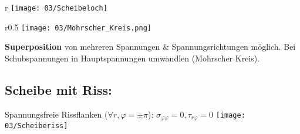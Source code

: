         \begin{wrapfigure}[0]{r}{\linewidth}
            \texttt{[image: 03/Scheibeloch]}
        \end{wrapfigure}
        \begin{wrapfigure}[6]{r}{0.5\linewidth}
            \vspace{-10mm}
            \texttt{[image: 03/Mohrscher\_Kreis.png]}
        \end{wrapfigure}
        \textbf{Superposition} von mehreren Spannungen \& Spannungsrichtungen möglich. Bei Schubspannungen in Hauptspannungen umwandlen (Mohrscher Kreis).
        \\
        
    \subsection{Scheibe mit Riss:}
        Spannungsfreie Rissflanken ($\forall r, \varphi=\pm\pi$): $\sigma_{\varphi\varphi}=0, \tau_{r\varphi}=0$
        \texttt{[image: 03/Scheiberiss]}